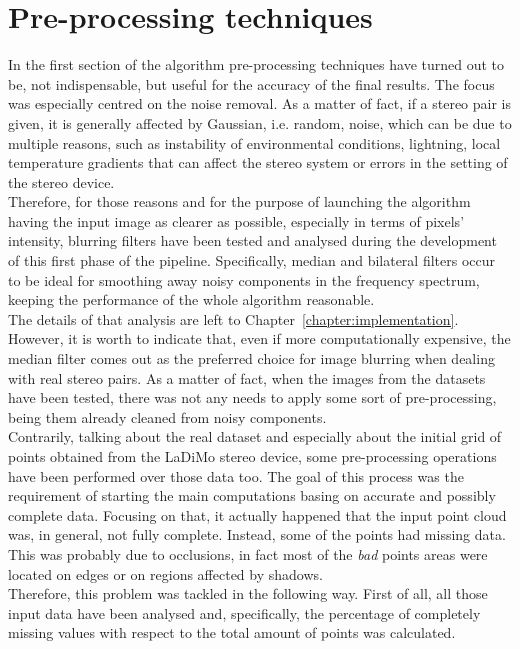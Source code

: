 \section{Pre-processing techniques}
\label{section:pre-process-tech}

In the first section of the algorithm pre-processing techniques have turned out to be, not indispensable, but useful for the accuracy of the final results.
The focus was especially centred on the noise removal. 
As a matter of fact, if a stereo pair is given, it is generally affected by Gaussian, i.e. random, noise, which can be due to multiple reasons, such as instability of environmental conditions, lightning, local temperature gradients that can affect the stereo system or errors in the setting of the stereo device. \\
Therefore, for those reasons and for the purpose of launching the algorithm having the input image as clearer as possible, especially in terms of pixels' intensity, blurring filters have been tested and analysed during the development of this first phase of the pipeline. 
Specifically, median and bilateral filters occur to be ideal for smoothing away noisy components in the frequency spectrum, keeping the performance of the whole algorithm reasonable. \\
The details of that analysis are left to Chapter~\ref{chapter:implementation}.
However, it is worth to indicate that, even if more computationally expensive, the median filter comes out as the preferred choice for image blurring when dealing with real stereo pairs.
As a matter of fact, when the images from the datasets have been tested, there was not any needs to apply some sort of pre-processing, being them already cleaned from noisy components. \\
Contrarily, talking about the real dataset and especially about the initial grid of points obtained from the LaDiMo stereo device, some pre-processing operations have been performed over those data too. 
The goal of this process was the requirement of starting the main computations basing on accurate and possibly complete data. 
Focusing on that, it actually happened that the input point cloud was, in general, not fully complete. 
Instead, some of the points had missing data.
This was probably due to occlusions, in fact most of the \textit{bad} points areas were located on edges or on regions affected by shadows. \\
Therefore, this problem was tackled in the following way.
First of all, all those input data have been analysed and, specifically, the percentage of completely missing values with respect to the total amount of points was calculated. 
